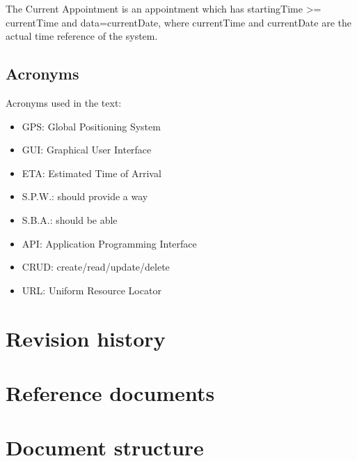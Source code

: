 \begin{definition}
The Current Appointment is an appointment which has startingTime >= currentTime and data=currentDate, where currentTime and  currentDate are the actual time reference of the system.
\end{definition}


\subsection{Acronyms}
Acronyms used in the text:
\begin{itemize}
\item GPS: Global Positioning System
\item GUI: Graphical User Interface
\item ETA: Estimated Time of Arrival
\item S.P.W.: should provide a way
\item S.B.A.: should be able 
\item API: Application Programming Interface
\item CRUD: create/read/update/delete
\item URL: Uniform Resource Locator
\end{itemize}



\section{Revision history}

\section{Reference documents}

\section{Document structure}

 
